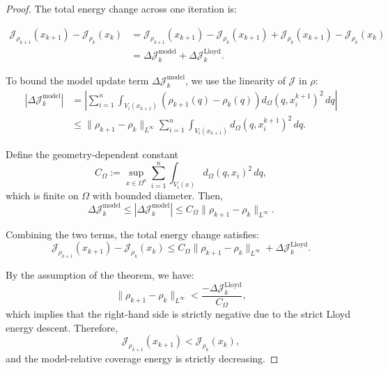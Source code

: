 \documentclass[onefignum,onetabnum]{siamart171218} %
\begin{document}
\begin{proof}
The total energy change across one iteration is:

\begin{align*}
    \mathcal{J}_{\rho_{k+1}}(x_{k+1}) - \mathcal{J}_{\rho_k}(x_k)
    &= \mathcal{J}_{\rho_{k+1}}(x_{k+1}) - \mathcal{J}_{\rho_k}(x_{k+1})
    + \mathcal{J}_{\rho_k}(x_{k+1}) - \mathcal{J}_{\rho_k}(x_k)
    \\
    &= \Delta\mathcal{J}_k^{\mathrm{model}} + \Delta\mathcal{J}_k^{\mathrm{Lloyd}}.
\end{align*} %

To bound the model update term $\Delta\mathcal{J}_k^{\mathrm{model}}$, we use the linearity of $\mathcal{J}$ in $\rho$:
\begin{align*}
    |\Delta\mathcal{J}_k^{\mathrm{model}}| 
    &= \left| \sum_{i=1}^n \int_{V_i(x_{k+1})} \left( \rho_{k+1}(q) - \rho_k(q) \right) d_\Omega(q, x_i^{k+1})^2 \, dq \right|
    \\
    &\leq \|\rho_{k+1} - \rho_k\|_{L^\infty} \sum_{i=1}^n \int_{V_i(x_{k+1})} d_\Omega(q, x_i^{k+1})^2 \, dq.
\end{align*}

Define the geometry-dependent constant
\[
    C_\Omega := \sup_{x \in \Omega^n} \sum_{i=1}^n \int_{V_i(x)} d_\Omega(q, x_i)^2 \, dq,
\]
which is finite on $\Omega$ with bounded diameter. %
Then,
\[
    \Delta\mathcal{J}_k^{\mathrm{model}} \leq |\Delta\mathcal{J}_k^{\mathrm{model}}| \leq C_\Omega \|\rho_{k+1} - \rho_k\|_{L^\infty}.
\]

Combining the two terms, the total energy change satisfies:
\[
    \mathcal{J}_{\rho_{k+1}}(x_{k+1}) - \mathcal{J}_{\rho_k}(x_k)
    \leq C_\Omega \|\rho_{k+1} - \rho_k\|_{L^\infty} + \Delta\mathcal{J}_k^{\mathrm{Lloyd}}.
\]

By the assumption of the theorem, we have:
\[
    \|\rho_{k+1} - \rho_k\|_{L^\infty} < \frac{-\Delta\mathcal{J}_k^{\mathrm{Lloyd}}}{C_\Omega},
\]
which implies that the right-hand side is strictly negative due to the strict Lloyd energy descent. Therefore,
\[
    \mathcal{J}_{\rho_{k+1}}(x_{k+1}) < \mathcal{J}_{\rho_k}(x_k),
\]
and the model-relative coverage energy is strictly decreasing.
\end{proof}
\end{document}
